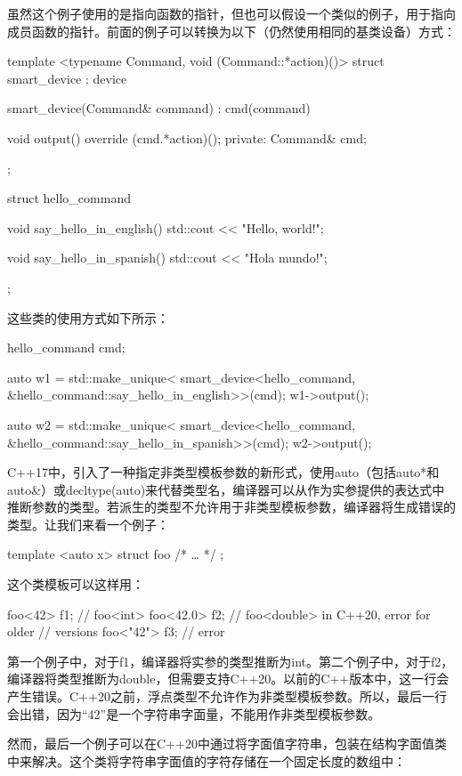 虽然这个例子使用的是指向函数的指针，但也可以假设一个类似的例子，用于指向成员函数的指针。前面的例子可以转换为以下（仍然使用相同的基类设备）方式：

\begin{cpp}
template <typename Command, void (Command::*action)()>
struct smart_device : device
{
	smart_device(Command& command) : cmd(command) {}
	
	void output() override
	{
		(cmd.*action)();
	}
private:
	Command& cmd;
};

struct hello_command
{
	void say_hello_in_english()
	{
		std::cout << "Hello, world!\n";
	}

	void say_hello_in_spanish()
	{
		std::cout << "Hola mundo!\n";
	}
};
\end{cpp}

这些类的使用方式如下所示：

\begin{cpp}
hello_command cmd;

auto w1 = std::make_unique<
	smart_device<hello_command,
		&hello_command::say_hello_in_english>>(cmd);
w1->output();

auto w2 = std::make_unique<
	smart_device<hello_command,
		&hello_command::say_hello_in_spanish>>(cmd);
w2->output();
\end{cpp}

C++17中，引入了一种指定非类型模板参数的新形式，使用auto（包括auto*和auto\&）或decltype(auto)来代替类型名，编译器可以从作为实参提供的表达式中推断参数的类型。若派生的类型不允许用于非类型模板参数，编译器将生成错误的类型。让我们来看一个例子：

\begin{cpp}
template <auto x>
struct foo
{ /* … */ };
\end{cpp}

这个类模板可以这样用：

\begin{cpp}
foo<42> f1;   // foo<int>
foo<42.0> f2; // foo<double> in C++20, error for older
              // versions
foo<"42"> f3; // error
\end{cpp}

第一个例子中，对于f1，编译器将实参的类型推断为int。第二个例子中，对于f2，编译器将类型推断为double，但需要支持C++20。以前的C++版本中，这一行会产生错误。C++20之前，浮点类型不允许作为非类型模板参数。所以，最后一行会出错，因为“42”是一个字符串字面量，不能用作非类型模板参数。

然而，最后一个例子可以在C++20中通过将字面值字符串，包装在结构字面值类中来解决。这个类将字符串字面值的字符存储在一个固定长度的数组中：


